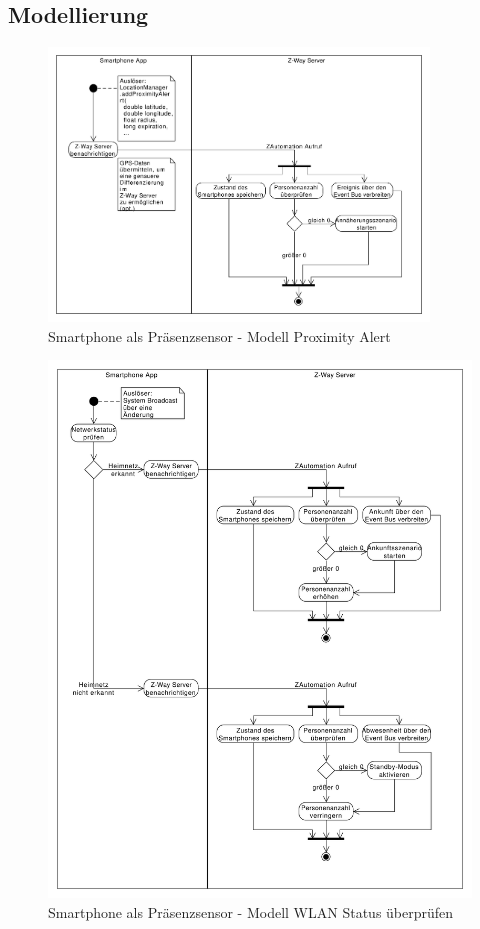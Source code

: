 \subsection{Modellierung}
\begin{figure}[h!]
	\centering
	\includegraphics[width=0.9\textwidth]{img/Szenarien/SmartphoneProximity.pdf}
	\caption{Smartphone als Präsenzsensor - Modell Proximity Alert}
	\label{fig:szenarienSmartphoneProximity}
\end{figure}

\begin{figure}[h!]
	\centering
	\includegraphics[width=1.0\textwidth]{img/Szenarien/SmartphoneWlan.pdf}
	\caption{Smartphone als Präsenzsensor - Modell WLAN Status überprüfen}
	\label{fig:szenarienSmartphoneWlan}
\end{figure}

